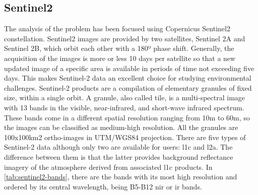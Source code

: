\documentclass[11pt, a4paper]{article}
\begin{document}
	\subsection{Sentinel2}
	The analysis of the problem has been focused using Copernicus Sentinel2 constellation. 
	Sentinel2 images are provided by two satellites, Sentinel 2A and Sentinel 2B, which orbit each other with a 180º phase shift. Generally, the acquisition of the images is more or less 10 days per satellite so that a new updated image of a specific area is available in periods of time not exceeding five days. This makes Sentinel-2 data an excellent choice for studying environmental challenges. Sentinel-2 products are a compilation of elementary granules of fixed size, within a single orbit. A granule, also called tile, is a multi-spectral image with 13 bands in the visible, near-infrared, and short-wave infrared spectrum. These bands come in a different spatial resolution ranging from 10m to 60m, so the images can be classified as medium-high resolution. All the granules are 100x100km2 ortho-images in UTM/WGS84 projection. There are five types of Sentinel-2 data although only two are available for users: \gls{l1c} and \gls{l2a}. The difference between them is that the latter provides background reflectance imagery of the atmosphere derived from associated \gls{l1c} products. In \ref{tab:sentinel2-bands}, there are the bands with its most high resolution and ordered by its central wavelength, being B5-B12 \gls{nir} or \gls{ir} bands.
\end{document}
